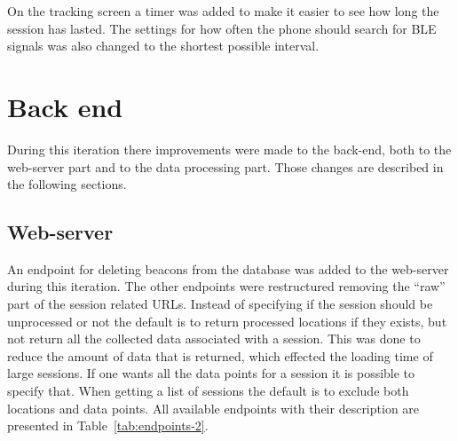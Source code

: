 \documentclass[../Main/thesis.tex]{subfiles}
\begin{document}
On the tracking screen a timer was added to make it easier to see how long the session has lasted.
The settings for how often the phone should search for BLE signals was also changed to the shortest possible interval.

\section{Back end}
During this iteration there improvements were made to the back-end, both to the web-server part and to the data processing part.
Those changes are described in the following sections.

\subsection{Web-server}
An endpoint for deleting beacons from the database was added to the web-server during this iteration.
The other endpoints were restructured removing the ``raw'' part of the session related URLs.
Instead of specifying if the session should be unprocessed or not the default is to return processed locations if they exists, but not return all the collected data associated with a session.
This was done to reduce the amount of data that is returned, which effected the loading time of large sessions.
If one wants all the data points for a session it is possible to specify that.
When getting a list of sessions the default is to exclude both locations and data points.
All available endpoints with their description are presented in Table~\ref{tab:endpoints-2}.
\end{document}
